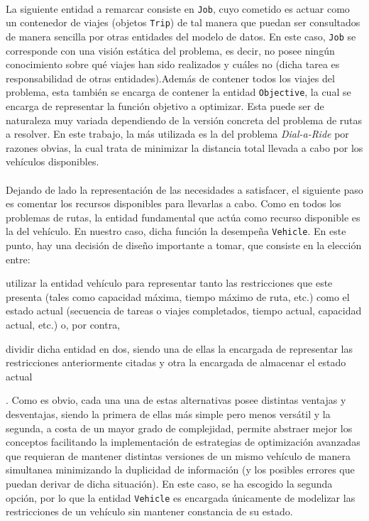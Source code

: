 \documentclass{subfiles}
\begin{document}
          \paragraph{}
          La siguiente entidad a remarcar consiste en \texttt{Job}, cuyo cometido es actuar como un contenedor de viajes (objetos \texttt{Trip}) de tal manera que puedan ser consultados de manera sencilla por otras entidades del modelo de datos. En este caso, \texttt{Job} se corresponde con una visión estática del problema, es decir, no posee ningún conocimiento sobre qué viajes han sido realizados y cuáles no (dicha tarea es responsabilidad de otras entidades).Además de contener todos los viajes del problema, esta también se encarga de contener la entidad \texttt{Objective}, la cual se encarga de representar la función objetivo a optimizar. Esta puede ser de naturaleza muy variada dependiendo de la versión concreta del problema de rutas a resolver. En este trabajo, la más utilizada es la del problema \emph{Dial-a-Ride} por razones obvias, la cual trata de minimizar la distancia total llevada a cabo por los vehículos disponibles.

          \paragraph{}
          Dejando de lado la representación de las necesidades a satisfacer, el siguiente paso es comentar los recursos disponibles para llevarlas a cabo. Como en todos los problemas de rutas, la entidad fundamental que actúa como recurso disponible es la del vehículo. En nuestro caso, dicha función la desempeña \texttt{Vehicle}. En este punto, hay una decisión de diseño importante a tomar, que consiste en la elección entre: \begin{enumerate*}[label=(\alph*)] \item utilizar la entidad vehículo para representar tanto las restricciones que este presenta (tales como capacidad máxima, tiempo máximo de ruta, etc.) como el estado actual (secuencia de tareas o viajes completados, tiempo actual, capacidad actual, etc.) o, por contra, \item dividir dicha entidad en dos, siendo una de ellas la encargada de representar las restricciones anteriormente citadas y otra la encargada de almacenar el estado actual \end{enumerate*}. Como es obvio, cada una una de estas alternativas posee distintas ventajas y desventajas, siendo la primera de ellas más simple pero menos versátil y la segunda, a costa de un mayor grado de complejidad, permite abstraer mejor los conceptos facilitando la implementación de estrategias de optimización avanzadas que requieran de mantener distintas versiones de un mismo vehículo de manera simultanea minimizando la duplicidad de información (y los posibles errores que puedan derivar de dicha situación). En este caso, se ha escogido la segunda opción, por lo que la entidad \texttt{Vehicle} es encargada únicamente de modelizar las restricciones de un vehículo sin mantener constancia de su estado.
\end{document}
